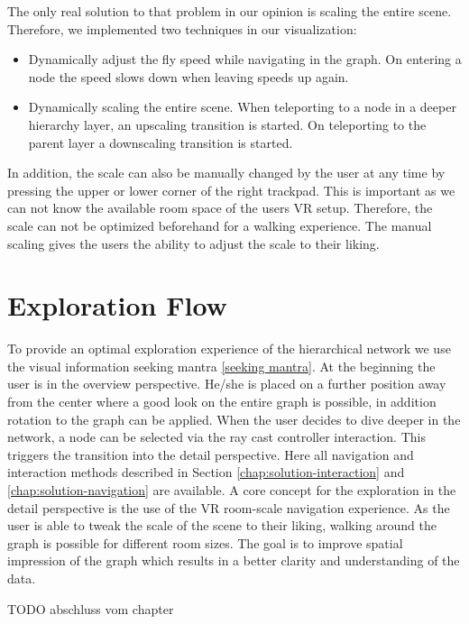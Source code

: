 The only real solution to that problem in our opinion is scaling the entire scene. Therefore, we implemented two techniques in our visualization:
\begin{itemize}
    \item Dynamically adjust the fly speed while navigating in the graph. On entering a node the speed slows down when leaving speeds up again. 
    \item Dynamically scaling the entire scene. When teleporting to a node in a deeper hierarchy layer, an upscaling transition is started. On teleporting to the parent layer a downscaling transition is started. 
\end{itemize} 

In addition, the scale can also be manually changed by the user at any time by pressing the upper or lower corner of the right trackpad. 
This is important as we can not know the available room space of the users VR setup. Therefore, the scale can not be optimized beforehand for a walking experience. The manual scaling gives the users the ability to adjust the scale to their liking.
\section{Exploration Flow}
\label{chap:ps-explorationFlow}
To provide an optimal exploration experience of the hierarchical network we use the visual information seeking mantra \ref{seeking mantra}. 
At the beginning the user is in the overview perspective. He/she is placed on a further position away from the center where a good look on the entire graph is possible, in addition rotation to the graph can be applied.
When the user decides to dive deeper in the network, a node can be selected via the ray cast controller interaction. This triggers the transition into the detail perspective. 
Here all navigation and interaction methods described in Section \ref{chap:solution-interaction} and \ref{chap:solution-navigation}
are available. 
A core concept for the exploration in the detail perspective is the use of the VR room-scale navigation experience. As the user is able to tweak the scale of the scene to their liking, walking around the graph is possible for different room sizes. The goal is to improve spatial impression of the graph which results in a better clarity and understanding of the data.

TODO abschluss vom chapter